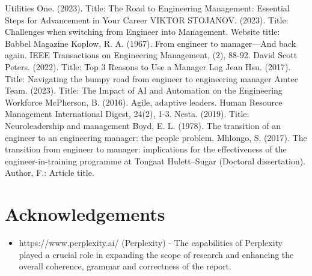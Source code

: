 \documentclass[runningheads]{article}
\begin{document}
%
%
%
% 
% 
%
\begin{thebibliography}{8}
Utilities One. (2023). Title: The Road to Engineering Management: Essential Steps for Advancement in Your Career
VIKTOR STOJANOV. (2023). Title: Challenges when switching from Engineer into Management. Website title: Babbel Magazine
Koplow, R. A. (1967). From engineer to manager—And back again. IEEE Transactions on Engineering Management, (2), 88-92.
David Scott Peters. (2022). Title: Top 3 Reasons to Use a Manager Log
Jean Hsu. (2017). Title: Navigating the bumpy road from engineer to engineering manager
Amtec Team. (2023). Title: The Impact of AI and Automation on the Engineering Workforce
McPherson, B. (2016). Agile, adaptive leaders. Human Resource Management International Digest, 24(2), 1-3.
Nesta. (2019). Title: Neuroleadership and management
Boyd, E. L. (1978). The transition of an engineer to an engineering manager: the people problem.
Mhlongo, S. (2017). The transition from engineer to manager: implications for the effectiveness of the engineer-in-training programme at Tongaat Hulett–Sugar (Doctoral dissertation).
Author, F.: Article title.
\end{thebibliography}

\section{Acknowledgements}
\begin{itemize}
    \item https://www.perplexity.ai/ (Perplexity) - The capabilities of Perplexity played a crucial role in expanding the scope of research and enhancing the overall coherence, grammar and correctness of the report.
\end{itemize}
\end{document}
